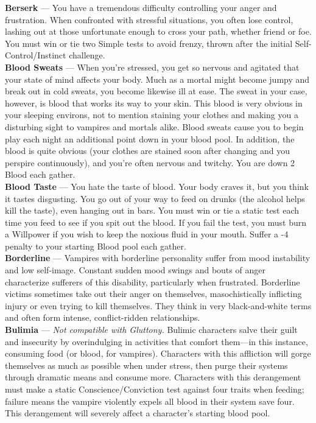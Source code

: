 \textbf{Berserk} --- You have a tremendous difficulty controlling your anger and frustration.  When confronted with stressful situations, you often lose control, lashing out at those unfortunate enough to cross your path, whether friend or foe.  You must win or tie two Simple tests to avoid frenzy, thrown after the initial Self-Control/Instinct challenge. \\

\textbf{Blood Sweats} --- When you're stressed, you get so nervous and agitated that your state of mind affects your body.  Much as a mortal might become jumpy and break out in cold sweats, you become likewise ill at ease.  The sweat in your case, however, is blood that works its way to your skin.  This blood is very obvious in your sleeping environs, not to mention staining your clothes and making you a disturbing sight to vampires and mortals alike.  Blood sweats cause you to begin play each night an additional point down in your blood pool.  In addition, the blood is quite obvious (your clothes are stained soon after changing and you perspire continuously), and you're often nervous and twitchy.  You are down 2 Blood each gather. \\

\textbf{Blood Taste} --- You hate the taste of blood.  Your body craves it, but you think it tastes disgusting.  You go out of your way to feed on drunks (the alcohol helps kill the taste), even hanging out in bars.  You must win or tie a static test each time you feed to see if you spit out the blood.  If you fail the test, you must burn a Willpower if you wish to keep the noxious fluid in your mouth. Suffer a -4 penalty to your starting Blood pool each gather. \\

\textbf{Borderline} --- Vampires with borderline personality suffer from mood instability and low self-image.  Constant sudden mood swings and bouts of anger characterize sufferers of this disability, particularly when frustrated.  Borderline victims sometimes take out their anger on themselves, masochistically inflicting injury or even trying to kill themselves.  They think in very black-and-white terms and often form intense, conflict-ridden relationships. \\

\textbf{Bulimia} --- \emph{Not compatible with Gluttony.}  Bulimic characters salve their guilt and insecurity by overindulging in activities that comfort them---in this instance, consuming food (or blood, for vampires).  Characters with this affliction will gorge themselves as much as possible when under stress, then purge their systems through dramatic means and consume more.  Characters with this derangement must make a static Conscience/Conviction test against four traits when feeding; failure means the vampire violently expels all blood in their system save four.  This derangement will severely affect a character's starting blood pool. \\

